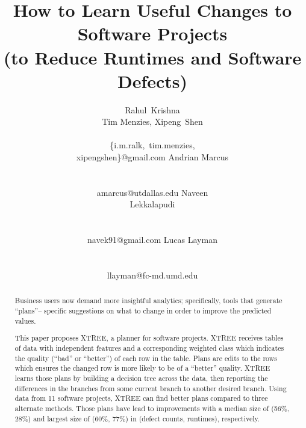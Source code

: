 \documentclass{sig-alternate}
\begin{document}
  


\title{How to Learn Useful Changes to Software Projects\\(to Reduce Runtimes and Software Defects)}
\author{  
\alignauthor
Rahul~Krishna\\Tim Menzies, Xipeng~Shen \\
       \\
       {\{i.m.ralk,~tim.menzies,\\xipengshen\}@gmail.com}
\alignauthor
Andrian Marcus \\
        \\ 
       \\ 
       {amarcus@utdallas.edu}
       \alignauthor
Naveen  \\ Lekkalapudi\\
  \\ 
       \\ 
       {navek91@gmail.com}
\alignauthor
Lucas Layman \\
        \\ 
       \\ 
       {llayman@fc-md.umd.edu}
\setlength{\columnsep}{7mm}
}
\maketitle
\begin{abstract}

Business users now demand more insightful analytics; specifically, tools that generate ``plans''-- specific suggestions on  what to change  in order to improve  the predicted values.
 
This paper proposes XTREE, a planner for software projects. XTREE receives tables of data with independent features and a corresponding weighted class which indicates the quality (``bad'' or ``better'') of each row in the table. Plans are edits to  the rows which ensures the changed row is more likely to be of a ``better'' quality.  XTREE learns those plans by building a decision tree across the data, then reporting the differences in the branches from some current branch to another desired branch.
Using data from 11 software projects,  XTREE can find better plans compared to three
alternate methods. Those plans have lead to improvements with a median size of (56\%, 28\%) and   largest size of (60\%, 77\%) in (defect counts, runtimes), respectively.
\end{abstract}
\end{document}
